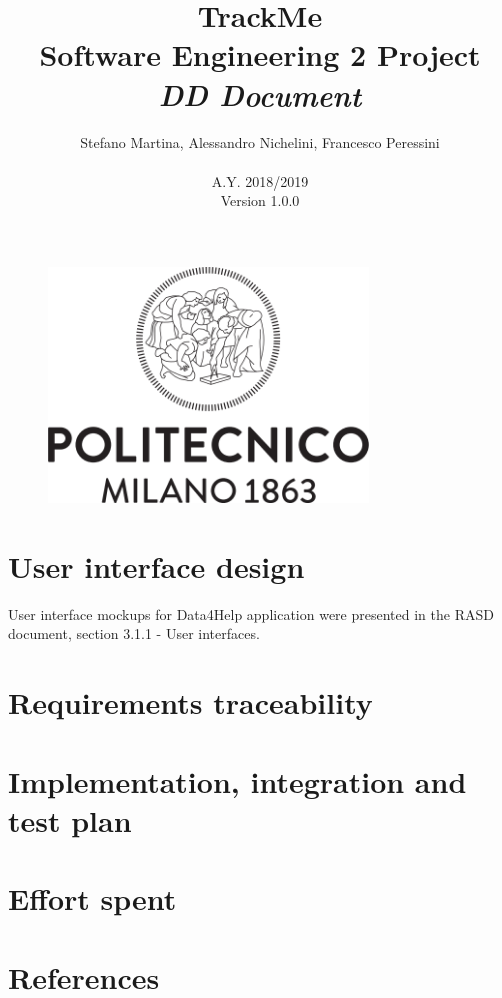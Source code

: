\documentclass{article}
\begin{document}
	\begin{figure}[t]
	\centering
	\includegraphics[height=6.25cm,keepaspectratio]{Figures/logo}
	\end{figure}
	
	\title{TrackMe \\ Software Engineering 2 Project \\ 
			\textit{DD Document} }
	\author{Stefano Martina, Alessandro Nichelini, Francesco Peressini
		\\ \\ A.Y. 2018/2019 \\ Version 1.0.0}
		
\maketitle
\newpage

\tableofcontents

\newpage






\section{User interface design}
User interface mockups for Data4Help application were presented in the RASD document, section 3.1.1 - User interfaces.

\section{Requirements traceability}

\section{Implementation, integration and test plan}
 
\section{Effort spent}

\section{References}
\newpage


 
\end{document}
